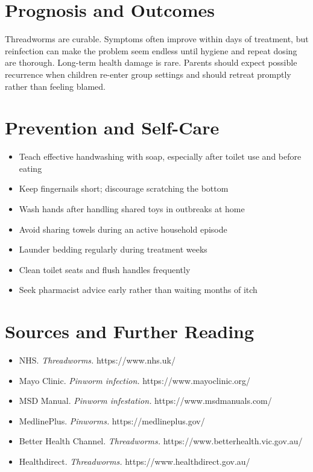 \section*{Prognosis and Outcomes}
Threadworms are curable. Symptoms often improve within days of treatment, but reinfection can make the problem seem endless until hygiene and repeat dosing are thorough. Long-term health damage is rare. Parents should expect possible recurrence when children re-enter group settings and should retreat promptly rather than feeling blamed.

\section*{Prevention and Self-Care}
\begin{itemize}
    \item Teach effective handwashing with soap, especially after toilet use and before eating
    \item Keep fingernails short; discourage scratching the bottom
    \item Wash hands after handling shared toys in outbreaks at home
    \item Avoid sharing towels during an active household episode
    \item Launder bedding regularly during treatment weeks
    \item Clean toilet seats and flush handles frequently
    \item Seek pharmacist advice early rather than waiting months of itch
\end{itemize}

\section*{Sources and Further Reading}
\begin{itemize}
    \item NHS. \textit{Threadworms.} https://www.nhs.uk/
    \item Mayo Clinic. \textit{Pinworm infection.} https://www.mayoclinic.org/
    \item MSD Manual. \textit{Pinworm infestation.} https://www.msdmanuals.com/
    \item MedlinePlus. \textit{Pinworms.} https://medlineplus.gov/
    \item Better Health Channel. \textit{Threadworms.} https://www.betterhealth.vic.gov.au/
    \item Healthdirect. \textit{Threadworms.} https://www.healthdirect.gov.au/
\end{itemize}
